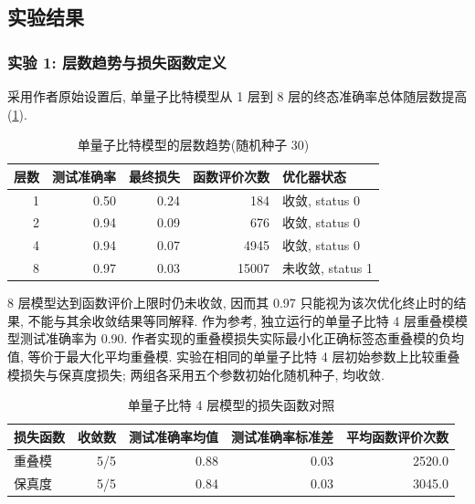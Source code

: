 \documentclass[a4paper]{ctexart}
\begin{document}
\subsection{实验结果}

\subsubsection{实验 1: 层数趋势与损失函数定义}

采用作者原始设置后, 单量子比特模型从 1 层到 8 层的终态准确率总体随层数提高(\cref{tab:m1-author-trend}).

\begin{table}[H]
    \centering
    \caption{单量子比特模型的层数趋势(随机种子 30)}
    \label{tab:m1-author-trend}
    \renewcommand{\arraystretch}{1.2}
    \begin{tabular}{@{}rrrrl@{}}
        \toprule
        层数 & 测试准确率 & 最终损失 & 函数评价次数 & 优化器状态         \\
        \midrule
        1  & 0.50  & 0.24 & 184    & 收敛, status 0  \\
        2  & 0.94  & 0.09 & 676    & 收敛, status 0  \\
        4  & 0.94  & 0.07 & 4945   & 收敛, status 0  \\
        8  & 0.97  & 0.03 & 15007  & 未收敛, status 1 \\
        \bottomrule
    \end{tabular}
\end{table}

8 层模型达到函数评价上限时仍未收敛, 因而其 0.97 只能视为该次优化终止时的结果, 不能与其余收敛结果等同解释. 作为参考, 独立运行的单量子比特 4 层重叠模模型测试准确率为 0.90. 作者实现的重叠模损失实际最小化正确标签态重叠模的负均值, 等价于最大化平均重叠模. 实验在相同的单量子比特 4 层初始参数上比较重叠模损失与保真度损失; 两组各采用五个参数初始化随机种子, 均收敛.

\begin{table}[H]
    \centering
    \caption{单量子比特 4 层模型的损失函数对照}
    \label{tab:m1-controlled-loss}
    \renewcommand{\arraystretch}{1.2}
    \begin{tabular}{@{}lrrrr@{}}
        \toprule
        损失函数 & 收敛数 & 测试准确率均值 & 测试准确率标准差 & 平均函数评价次数 \\
        \midrule
        重叠模  & 5/5 & 0.88    & 0.03     & 2520.0   \\
        保真度  & 5/5 & 0.84    & 0.03     & 3045.0   \\
        \bottomrule
    \end{tabular}
\end{table}
\end{document}
